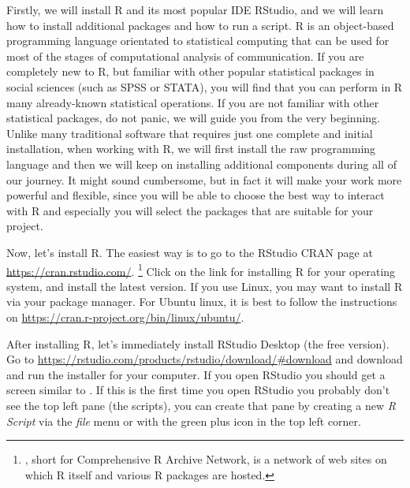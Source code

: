 Firstly, we will install R and its most popular IDE RStudio, and we
will learn how to install additional packages and how to run a
script. R is an object-based programming language
orientated to statistical computing that can be used for most of the
stages of computational analysis of communication.  If you are
completely new to R, but familiar with other popular
statistical packages in social sciences (such as SPSS or STATA), you
will find that you can perform in R many already-known statistical
operations. If you are not familiar with other statistical packages,
do not panic, we will guide you from the very beginning. Unlike
many traditional software that requires just one complete and initial
installation, when working with R, we will first install the raw
programming language and then we will keep on installing additional
components during all of our journey. It might sound cumbersome, but
in fact it will make your work more powerful and flexible, since you
will be able to choose the best way to interact with R and especially
you will select the packages that are suitable for your project.

Now, let's install R.
The easiest way is to go to the RStudio CRAN page at \url{https://cran.rstudio.com/}.
\footnote{, short for Comprehensive R Archive Network, is a network
  of web sites on which R itself and various R packages are hosted.}
Click on the link for installing R for your operating system, and
install the latest version.
If you use Linux, you may want to install R via your package manager.
For Ubuntu linux, it is best to follow the instructions on \url{https://cran.r-project.org/bin/linux/ubuntu/}.


After installing R, let's immediately install RStudio Desktop (the free version).
Go to \url{https://rstudio.com/products/rstudio/download/#download} and download and run the installer for your computer.
If you open RStudio you should get a screen similar to .
If this is the first time you open RStudio you probably don't see the top left pane (the scripts),
you can create that pane by creating a new \emph{R Script} via the \emph{file} menu or with the green plus icon in the top left corner. 

